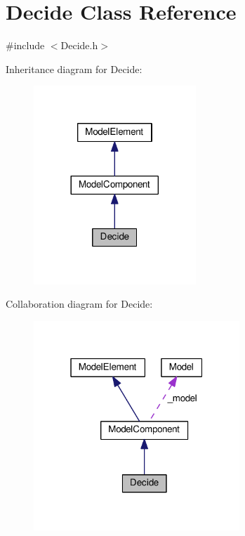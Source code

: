 \hypertarget{class_decide}{}\section{Decide Class Reference}
\label{class_decide}


{\ttfamily \#include $<$Decide.\+h$>$}



Inheritance diagram for Decide\+:\nopagebreak
\begin{figure}[H]
\begin{center}
\leavevmode
\includegraphics[width=173pt]{class_decide__inherit__graph}
\end{center}
\end{figure}


Collaboration diagram for Decide\+:\nopagebreak
\begin{figure}[H]
\begin{center}
\leavevmode
\includegraphics[width=220pt]{class_decide__coll__graph}
\end{center}
\end{figure}

